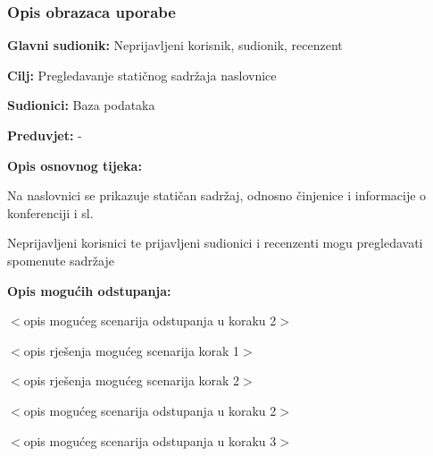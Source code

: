 				\subsubsection{Opis obrazaca uporabe}
					
					\noindent {}
					\begin{packed_item}
	
						\item \textbf{Glavni sudionik: } Neprijavljeni korisnik, sudionik, recenzent
						\item  \textbf{Cilj:} Pregledavanje statičnog sadržaja naslovnice
						\item  \textbf{Sudionici:} Baza podataka
						\item  \textbf{Preduvjet:} -
						\item  \textbf{Opis osnovnog tijeka:}
						
						\item[] \begin{packed_enum}
	
							\item Na naslovnici se prikazuje statičan sadržaj, odnosno činjenice i informacije o konferenciji i sl.
							\item Neprijavljeni korisnici te prijavljeni sudionici i recenzenti mogu pregledavati spomenute sadržaje
						\end{packed_enum}
						
						\item  \textbf{Opis mogućih odstupanja:}
						
						\item[] \begin{packed_item}
	
							\item[2.a] $<$opis mogućeg scenarija odstupanja u koraku 2$>$
							\item[] \begin{packed_enum}
								
								\item $<$opis rješenja mogućeg scenarija korak 1$>$
								\item $<$opis rješenja mogućeg scenarija korak 2$>$
								
							\end{packed_enum}
							\item[2.b] $<$opis mogućeg scenarija odstupanja u koraku 2$>$
							\item[3.a] $<$opis mogućeg scenarija odstupanja  u koraku 3$>$
							
						\end{packed_item}
					\end{packed_item}

